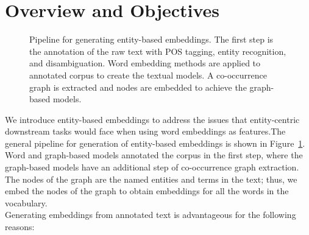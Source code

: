 \section{Overview and Objectives}\label{sec:entity_overview}
\begin{figure}
\centering 
\resizebox{0.97\textwidth}{0.32\textwidth}{      

}
\caption{Pipeline for generating entity-based embeddings. The first step is the annotation of the raw text with POS tagging, entity recognition, and disambiguation. Word embedding methods are applied to annotated corpus to create the textual models. A co-occurrence graph is extracted and nodes are embedded to achieve the graph-based models.}
\label{fig:entity_emebddings_pipline}
\end{figure}
We introduce entity-based embeddings to address the issues that entity-centric downstream tasks would face when using word embeddings as features.The general pipeline for generation of entity-based embeddings is shown in Figure~\ref{fig:entity_emebddings_pipline}. Word and graph-based models annotated the corpus in the first step, where the graph-based models have an additional step of co-occurrence graph extraction. The nodes of the graph are the named entities and terms in the text; thus, we embed the nodes of the graph to obtain embeddings for all the words in the vocabulary. \\
Generating embeddings from annotated text is advantageous for the following reasons:
